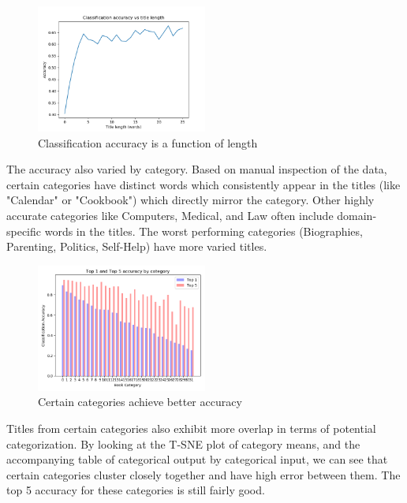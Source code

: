 \documentclass[jou,apacite, 10px]{apa6}
\begin{document}
\begin{figure}[h!]
\captionsetup{justification=centering}
    \centering
        \includegraphics[width=0.5\textwidth]{images/title-length-accuracy-white}
        \caption{Classification accuracy is a function of length}
\end{figure}

The accuracy also varied by category. Based on manual inspection of the data, certain categories have distinct words which consistently appear in the titles (like "Calendar" or "Cookbook") which directly mirror the category. Other highly accurate categories like Computers, Medical, and Law often include domain-specific words in the titles. The worst performing categories (Biographies, Parenting, Politics, Self-Help) have more varied titles.\\

\begin{figure}[h!]
    \captionsetup{justification=centering}
        \centering
            \includegraphics[width=0.5\textwidth]{images/Category_Top1_Top5}
            \caption{Certain categories achieve better accuracy}
    \end{figure}

Titles from certain categories also exhibit more overlap in terms of potential categorization. By looking at the T-SNE plot of category means, and the accompanying table of categorical output by categorical input, we can see that certain categories cluster closely together and have high error between them. The top 5 accuracy for these categories is still fairly good.\\
\end{document}
